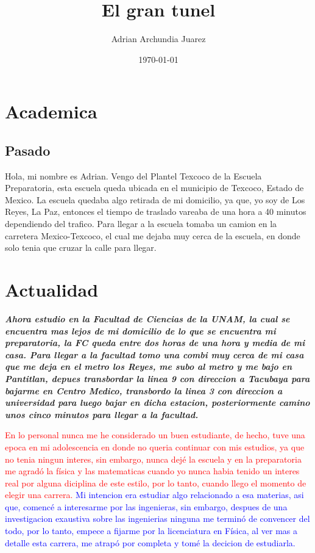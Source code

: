 \documentclass[12pt]{article}
\title{El gran tunel}
\author{Adrian Archundia Juarez }
\date{\today}
\begin{document}
\maketitle

\section{Academica}
\subsection{Pasado}
Hola, mi nombre es Adrian. Vengo del Plantel Texcoco de la Escuela Preparatoria, esta escuela queda ubicada en el municipio de Texcoco, Estado de Mexico. La escuela quedaba algo retirada de mi domicilio, ya que, yo soy de Los Reyes, La Paz, entonces el tiempo de traslado vareaba de una hora a 40 minutos dependiendo del trafico. Para llegar a la escuela tomaba un camion en la carretera Mexico-Texcoco, el cual me dejaba muy cerca de la escuela, en donde solo tenia que cruzar la calle para llegar.

\section{Actualidad}

\textbf{\textit{Ahora estudio en la Facultad de Ciencias de la UNAM, la cual se encuentra mas lejos de mi domicilio de lo que se encuentra mi preparatoria, la FC queda entre dos horas de una hora y media de mi casa. Para llegar a la facultad tomo una combi muy cerca de mi casa que me deja en el metro los Reyes, me subo al metro y me bajo en Pantitlan, depues transbordar la linea 9 con direccion a Tacubaya para bajarme en Centro Medico, transbordo la linea 3 con direccion a universidad para luego bajar en dicha estacion, posteriormente camino unos cinco minutos para llegar a la facultad.}}
\newpage

\textcolor{red}{En lo personal nunca me he considerado un buen estudiante, de hecho, tuve una epoca en mi adolescencia en donde no queria continuar con mis estudios, ya que no tenia ningun interes, sin embargo, nunca dejé la escuela y en la preparatoria me agradó la física y las matematicas cuando yo nunca habia tenido un interes real por alguna diciplina de este estilo, por lo tanto, cuando llego el momento de elegir una carrera.}
\textcolor{blue}{Mi intencion era estudiar algo relacionado a esa materias, asi que, comencé a interesarme por las ingenieras, sin embargo, despues de una investigacion exaustiva sobre las ingenierias ninguna me terminó de convencer del todo, por lo tanto, empece a fijarme por la licenciatura en Física, al ver mas a detalle esta carrera, me atrapó por completa y tomé la decicion de estudiarla.}
 
\end{document}
